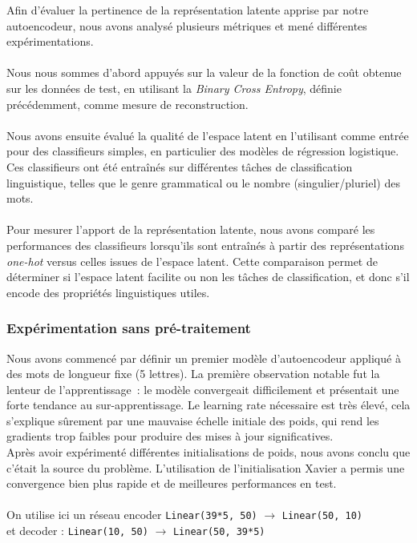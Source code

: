 \documentclass{article}
\begin{document}
Afin d’évaluer la pertinence de la représentation latente apprise par notre autoencodeur, nous avons analysé plusieurs métriques et mené différentes expérimentations.
\\ \\
Nous nous sommes d’abord appuyés sur la valeur de la fonction de coût obtenue sur les données de test, en utilisant la \textit{Binary Cross Entropy}, définie précédemment, comme mesure de reconstruction.
\\ \\
Nous avons ensuite évalué la qualité de l’espace latent en l’utilisant comme entrée pour des classifieurs simples, en particulier des modèles de régression logistique. Ces classifieurs ont été entraînés sur différentes tâches de classification linguistique, telles que le genre grammatical ou le nombre (singulier/pluriel) des mots.
\\ \\
Pour mesurer l’apport de la représentation latente, nous avons comparé les performances des classifieurs lorsqu’ils sont entraînés à partir des représentations \textit{one-hot} versus celles issues de l’espace latent. Cette comparaison permet de déterminer si l’espace latent facilite ou non les tâches de classification, et donc s’il encode des propriétés linguistiques utiles.

\subsubsection{Expérimentation sans pré-traitement}

Nous avons commencé par définir un premier modèle d’autoencodeur appliqué à des mots de longueur fixe (5 lettres). La première observation notable fut la lenteur de l’apprentissage~: le modèle convergeait difficilement et présentait une forte tendance au sur-apprentissage. Le learning rate nécessaire est très élevé, cela s’explique sûrement par une mauvaise échelle initiale des poids, qui rend les gradients trop faibles pour produire des mises à jour significatives.
\\
Après avoir expérimenté différentes initialisations de poids, nous avons conclu que c’était la source du problème. L’utilisation de l’initialisation Xavier a permis une convergence bien plus rapide et de meilleures performances en test.
\\ \\
On utilise ici un réseau encoder \texttt{Linear(39*5, 50)} $\rightarrow$ \texttt{Linear(50, 10)} 
\\
et decoder : \texttt{Linear(10, 50)} $\rightarrow$ \texttt{Linear(50, 39*5)}
\end{document}

